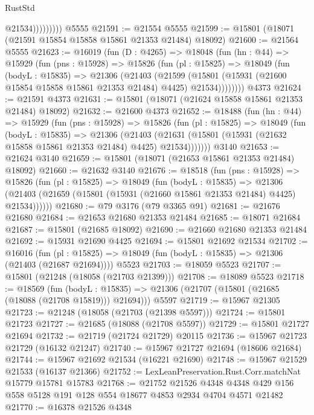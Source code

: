 \begin{lexlean}{RustStd}
\begin{coremodule}
                      @21534)))))))))
    @5555
@21591 := @21554 @5555
@21599 := @15801 (@18071 (@21591 @15854 @15858 @15861 @21353 @21484) @18092)
@21600 := @21564 @5555
@21623 := @16019
    (fun (D : @4265) =>
    @18048
      (fun (hn : @44) =>
      @15929
        (fun (pns : @15928) =>
        @15826
          (fun (pl : @15825) =>
          @18049
            (fun (bodyL : @15835) =>
            @21306
              (@21403
                (@21599
                  (@15801 (@15931 (@21600 @15854 @15858 @15861 @21353 @21484) @4425) @21534))))))))
    @4373
@21624 := @21591 @4373
@21631 := @15801 (@18071 (@21624 @15858 @15861 @21353 @21484) @18092)
@21632 := @21600 @4373
@21652 := @18488
    (fun (hn : @44) =>
    @15929
      (fun (pns : @15928) =>
      @15826
        (fun (pl : @15825) =>
        @18049
          (fun (bodyL : @15835) =>
          @21306
            (@21403
              (@21631 (@15801 (@15931 (@21632 @15858 @15861 @21353 @21484) @4425) @21534)))))))
    @3140
@21653 := @21624 @3140
@21659 := @15801 (@18071 (@21653 @15861 @21353 @21484) @18092)
@21660 := @21632 @3140
@21676 := @18518
    (fun (pns : @15928) =>
    @15826
      (fun (pl : @15825) =>
      @18049
        (fun (bodyL : @15835) =>
        @21306 (@21403 (@21659 (@15801 (@15931 (@21660 @15861 @21353 @21484) @4425) @21534))))))
@21680 := @79 @3176 (@79 @3365 @91)
@21681 := @21676 @21680
@21684 := @21653 @21680 @21353 @21484
@21685 := @18071 @21684
@21687 := @15801 (@21685 @18092)
@21690 := @21660 @21680 @21353 @21484
@21692 := @15931 @21690 @4425
@21694 := @15801 @21692 @21534
@21702 := @16016
    (fun (pl : @15825) => @18049 (fun (bodyL : @15835) => @21306 (@21403 (@21687 @21694))))
    @5523
@21703 := @18059 @5523
@21707 := @15801 (@21248 (@18058 (@21703 @21399)))
@21708 := @18089 @5523
@21718 := @18569
    (fun (bodyL : @15835) => @21306 (@21707 (@15801 (@21685 (@18088 (@21708 @15819))) @21694)))
    @5597
@21719 := @15967 @21305
@21723 := @21248 (@18058 (@21703 (@21398 @5597)))
@21724 := @15801 @21723
@21727 := @21685 (@18088 (@21708 @5597))
@21729 := @15801 @21727 @21694
@21732 := @21719 (@21724 @21729) @20115
@21736 := @15967 @21723 @21729 (@16132 @21247)
@21740 := @15967 @21727 @21694 (@18606 @21684)
@21744 := @15967 @21692 @21534 (@16221 @21690)
@21748 := @15967 @21529 @21533 (@16137 @21366)
@21752 := LexLeanPreservation.Rust.Corr.matchNat @15779 @15781 @15783
@21768 := @21752
    @21526
    @4348
    @4348
    @429
    @156
    @558
    @5128
    @191
    @128
    @554
    @18677
    @4853
    @2934
    @4704
    @4571
    @21482
@21770 := @16378 @21526 @4348

\end{coremodule}
\end{lexlean}
